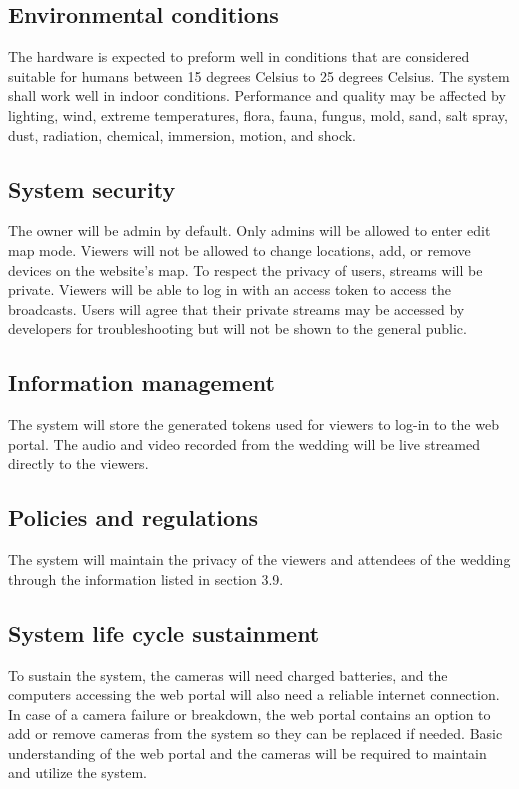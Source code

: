 \documentclass[onecolumn, draftclsnofoot,10pt, compsoc]{IEEEtran}
\begin{document}
    \subsection{Environmental conditions}
    The hardware is expected to preform well in conditions that are considered suitable for humans between 15 degrees Celsius to 25 degrees Celsius. 
    The system shall work well in indoor conditions. Performance and quality may be affected by lighting, wind, extreme temperatures, flora, fauna, fungus, mold, sand, salt spray, dust, radiation, chemical, immersion, motion, and shock.
    
    \subsection{System security}
    The owner will be admin by default. 
    Only admins will be allowed to enter edit map mode. 
    Viewers will not be allowed to change locations, add, or remove devices on the website's map. 
    To respect the privacy of users, streams will be private. 
    Viewers will be able to log in with an access token to access the broadcasts. Users will agree that their private streams may be accessed by developers for troubleshooting but will not be shown to the general public.
    
    \subsection{Information management}
    The system will store the generated tokens used for viewers to log-in to the web portal.
    The audio and video recorded from the wedding will be live streamed directly to the viewers.
    
    \subsection{Policies and regulations}
    The system will maintain the privacy of the viewers and attendees of the wedding through the information listed in section 3.9.
    
    \subsection{System life cycle sustainment}
    To sustain the system, the cameras will need charged batteries, and the computers accessing the web portal will also need a reliable internet connection. 
    In case of a camera failure or breakdown, the web portal contains an option to add or remove cameras from the system so they can be replaced if needed.
    Basic understanding of the web portal and the cameras will be required to maintain and utilize the system.
    
\end{document}
